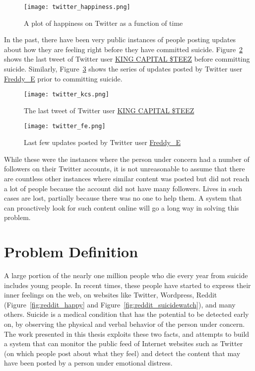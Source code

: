 \begin{figure}
    \centering
    \texttt{[image: twitter\_happiness.png]}
    \caption{A plot of happiness on Twitter as a function of time}
    \label{fig:twitter_happiness}
\end{figure}

In the past, there have been very public instances of people posting updates about how they are feeling right before they have committed suicide. Figure~\ref{fig:twitter_kcs} shows the last tweet of Twitter user \href{http://twitter.com/CapitalSTEEZ\_}{KING CAPITAL \$TEEZ} before committing suicide. Similarly, Figure~\ref{fig:twitter_fe} shows the series of updates posted by Twitter user \href{http://twitter.com/Freddy\_E}{Freddy\_E} prior to committing suicide.\\

\begin{figure}
    \centering
    \texttt{[image: twitter\_kcs.png]}
    \caption{The last tweet of Twitter user \href{http://twitter.com/CapitalSTEEZ\_}{KING CAPITAL \$TEEZ}}
    \label{fig:twitter_kcs}
\end{figure}

\begin{figure}
    \centering
    \texttt{[image: twitter\_fe.png]}
    \caption{Last few updates posted by Twitter user \href{http://twitter.com/Freddy\_E}{Freddy\_E}}
    \label{fig:twitter_fe}
\end{figure}

While these were the instances where the person under concern had a number of followers on their Twitter accounts, it is not unreasonable to assume that there are countless other instances where similar content was posted but did not reach a lot of people because the account did not have many followers. Lives in such cases are lost, partially because there was no one to help them. A system that can proactively look for such content online will go a long way in solving this problem.

\section{Problem Definition}
A large portion of the nearly one million people who die every year from suicide includes young people. In recent times, these people have started to express their inner feelings on the web, on websites like Twitter, Wordpress, Reddit (Figure~\ref{fig:reddit_happy} and Figure~\ref{fig:reddit_suicidewatch}), and many others. Suicide is a medical condition that has the potential to be detected early on, by observing the physical and verbal behavior of the person under concern. The work presented in this thesis exploits these two facts, and attempts to build a system that can monitor the public feed of Internet websites such as Twitter (on which people post about what they feel) and detect the content that may have been posted by a person under emotional distress.\\

